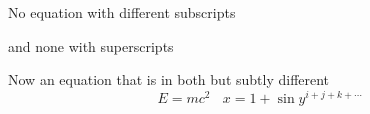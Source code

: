 \documentclass{article}
\begin{document}
No equation with different subscripts

and none with superscripts

Now an equation that is in both but subtly different
\begin{displaymath}
E=mc^2\ \ \ \ x=1+\sin y^{i+j+k+\cdots}
\end{displaymath}
\end{document}
